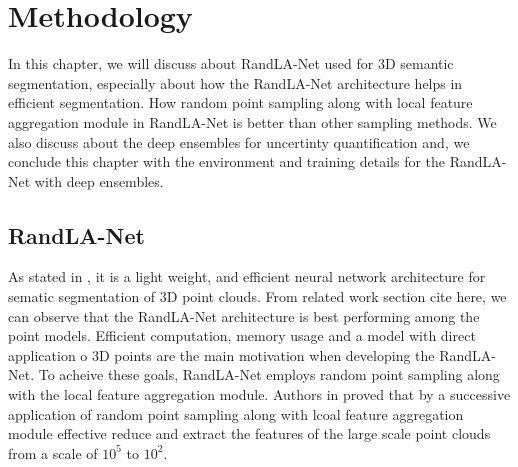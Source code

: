 
\chapter{Methodology}
In this chapter, we will discuss about RandLA-Net used for 3D semantic segmentation, 
especially about how the RandLA-Net architecture helps in efficient segmentation.
How random point sampling along with local feature aggregation module in RandLA-Net is better than other sampling methods.
We also discuss about the deep ensembles for uncertinty quantification and, we conclude this chapter with the environment and training details for the RandLA-Net with deep ensembles.
\section{RandLA-Net}
As stated in \cite{Hu_2020_CVPR_Randla}, it is a light weight, and efficient neural network architecture for sematic segmentation of 3D point clouds.
From related work section cite here, we can observe that the RandLA-Net architecture is best performing among the point models.
Efficient computation, memory usage and a model with direct application o 3D points are the main motivation when developing the RandLA-Net.
To acheive these goals, RandLA-Net employs random point sampling along with the local feature aggregation module.
Authors in \cite{Hu_2020_CVPR_Randla} proved that by a successive application of random point sampling along with lcoal feature aggregation module effective reduce and extract the features of the large scale point clouds from a scale of $10^5$ to $10^2$.

